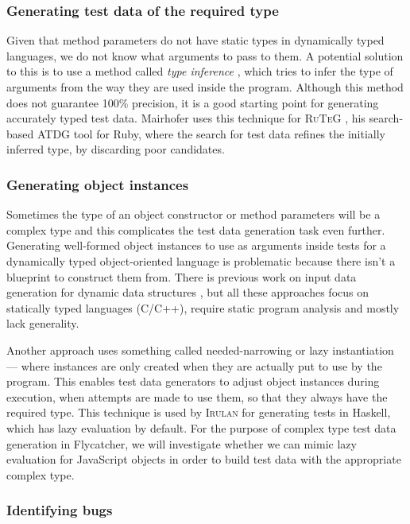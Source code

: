 \documentclass[a4paper,11pt,titlepage]{report}
\begin{document}
\subsubsection{Generating test data of the required type}
Given that method parameters do not have static types in dynamically typed languages, we do not know what arguments to pass to them. A potential solution to this is to use a method called \emph{type inference} \cite{pluquet2009fast}, which tries to infer the type of arguments from the way they are used inside the program. Although this method does not guarantee 100\% precision, it is a good starting point for generating accurately typed test data. Mairhofer uses this technique for \textsc{\small RuTeG} \cite{mairhofer2008search}, his search-based ATDG tool for Ruby, where the search for test data refines the initially inferred type, by discarding poor candidates.

\subsubsection{Generating object instances}
Sometimes the type of an object constructor or method parameters will be a complex type and this complicates the test data generation task even further. Generating well-formed object instances to use as arguments inside tests for a dynamically typed object-oriented language is problematic because there isn't a blueprint to construct them from. There is previous work on input data generation for dynamic data structures \cite{korel1990automated, visvanathan2002generating, sai2005address, zhao2007automatic}, but all these approaches focus on statically typed languages (C/C++), require static program analysis and mostly lack generality.

Another approach uses something called needed-narrowing \cite{antoy1994needed} or lazy instantiation \cite{lindblad2007property} --- where instances are only created when they are actually put to use by the program. This enables test data generators to adjust object instances during execution, when attempts are made to use them, so that they always have the required type. This technique is used by \textsc{Irulan} \cite{allwood2011high} for generating tests in Haskell, which has lazy evaluation by default. For the purpose of complex type test data generation in Flycatcher, we will investigate whether we can mimic lazy evaluation for JavaScript objects in order to build test data with the appropriate complex type.

\subsubsection{Identifying bugs}
\end{document}
